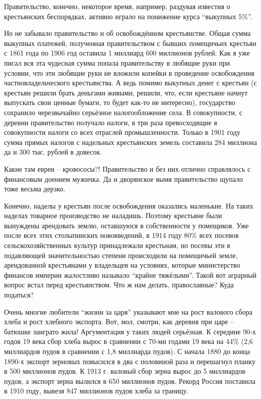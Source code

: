 Правительство, конечно, некоторое время, например, раздувая известия о
крестьянских беспорядках, активно играло на понижение курса \enquote{выкупных
5\%}.

Но не забывало правительство и об освобождённом крестьянстве. Общая сумма
выкупных платежей, полученная правительством с бывших помещичьих крестьян с
1861 года по 1906 год оставила 1 миллиард 600 миллионов рублей. Как я уже писал
вся эта чудесная сумма попала правительству в любящие руки при условии, что эти
любящие руки не вложили копейки в проведение освобождения частновладельческого
крестьянства. А ведь помимо выкупных денег с крестьян (с крестьян решили брать
деньгами живыми, решили, что, если крестьяне начнут выпускать свои ценные
бумаги, то будет как-то не интересно), государство сохранило черезвычайно
серьёзное налогообложение села. В совокупности, с деревни правительство получало
налоги, в три раза превосходящие в совокупности налоги со всех отраслей
промышленности. Только в 1901 году сумма прямых налогов с надельных крестьянских
земель составила 284 миллиона да и 300 тыс. рублей в довесок.

Какие там евреи -- кровососы?! Правительство и без них отлично справлялось с
финансовым доением мужичка. Да и дворянское вымя правительство щупало тоже
весьма дерзко.

Конечно, наделы у крестьян после освобождения оказались маленькие. На таких
наделах товарное производство не наладишь. Поэтому крестьяне были вынуждены
арендовать землю, оставшуюся в собственности у помещиков. Уже после всех этих
столыпинских нововведений, в 1914 году 80\% всех посевов сельскохозяйственных
культур принадлежали крестьнам, но посевы эти в подавляющей значительностью
степени происходили на помещичьей земле, арендованной крестьянами у владельцев
на условиях, которые министерство финансов империи жалостливо называло
\enquote{крайне тяжёлыми}. Такой вот аграрный вопрос встал перед крестьянством.
Что ж нам делать, православные? Куда податься?

Очень многие любители \enquote{жизни за царя} указывают мне на рост валового
сбора хлеба и рост хлебного экспорта. Вот, мол, смотри, как деревня при царе --
батюшке заиграто жила! Аргументация у таких людей серьёзная. К середине 90-х
годов 19 века сбор хлеба вырос в сравнении с 70-ми годами 19 века на 44\%
(2,6 миллиардов пудов в сравнении с 1,8 миллиарда пудов). С начала 1880 до
конца 1890-х экспорт зерновых повысился в два с половиной раза и перешагнул
планку в 500 миллионов пудов. К 1913 г. валовый сбор зерна вырос до 5 миллиардов
пудов, а экспорт зерна вылился в 650 миллионов пудов. Рекорд Россия поставила в
1910 году, вывезя 847 миллионов пудов хлеба за границу.


